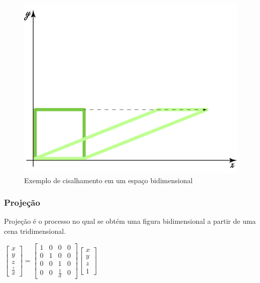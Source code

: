 \documentclass[9pt, a4paper, nofonttune, journal]{IEEEtran}
\begin{document}
\begin{figure}[H] 
\begin{center}
\includegraphics[scale=0.25]{figuras/shear1.png}
\caption{Exemplo de cisalhamento em um espaço bidimensional}
\end{center}
\end{figure}

\subsubsection{Projeção}
Projeção é o processo no qual se obtém uma figura bidimensional a partir de uma cena tridimensional.\cite{CGPPBook1}


\begin{center}
$\begin{bmatrix}x\\
y\\
z\\
\frac{z}{d}
\end{bmatrix}=\begin{bmatrix}1 & 0 & 0 & 0\\
0 & 1 & 0 & 0\\
0 & 0 & 1 & 0\\
0 & 0 & \frac{1}{d} & 0
\end{bmatrix}\begin{bmatrix}x\\
y\\
z\\
1
\end{bmatrix}$\end{center}
\end{document}

